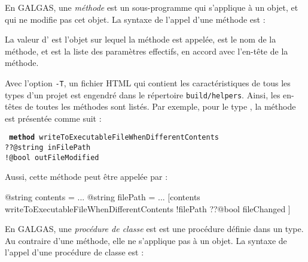 {{

En GALGAS, une \emph{méthode} est un sous-programme qui s'applique à un objet, et qui ne modifie pas cet objet. La syntaxe de l'appel d'une méthode est :
\begin{galgascode}
\end{galgascode}

La valeur d' est l'objet sur lequel la méthode est appelée,  est le nom de la méthode, et  est la liste des paramètres effectifs, en accord avec l'en-tête de la méthode.

Avec l'option \texttt{-T}, un fichier HTML qui contient les caractéristiques de tous les types d'un projet est engendré dans le répertoire \texttt{build/helpers}. Ainsi, les en-têtes de toutes les méthodes sont listés. Par exemple, pour le type , la méthode  est présentée comme suit :

\texttt{
\textbf{method} writeToExecutableFileWhenDifferentContents\\
\hspace*{1cm}??@string inFilePath\\
\hspace*{1cm}!@bool outFileModified
}

Aussi, cette méthode peut être appelée par :
\begin{galgascode}
@string contents = ...
@string filePath = ...
[contents writeToExecutableFileWhenDifferentContents
  !filePath
  ??@bool fileChanged
]
\end{galgascode}
















En GALGAS, une \emph{procédure de classe} est est une procédure définie dans un type. Au contraire d'une méthode, elle ne s'applique pas à un objet. La syntaxe de l'appel d'une procédure de classe est :
\begin{galgascode}
\end{galgascode}

}}
